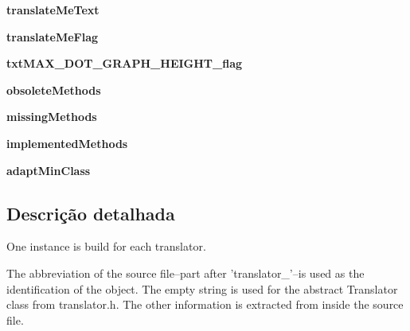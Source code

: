 \begin{DoxyCompactItemize}
\item 
\hypertarget{classtranslator_1_1_transl_a197d2af74d1a50c397381fcace2dabc0}{{\bfseries translate\-Me\-Text}}\label{classtranslator_1_1_transl_a197d2af74d1a50c397381fcace2dabc0}

\item 
\hypertarget{classtranslator_1_1_transl_a46befe7311ca8b2c7f7bd61391a568dc}{{\bfseries translate\-Me\-Flag}}\label{classtranslator_1_1_transl_a46befe7311ca8b2c7f7bd61391a568dc}

\item 
\hypertarget{classtranslator_1_1_transl_a853693f50c963a1af626b44d08f0a10d}{{\bfseries txt\-M\-A\-X\-\_\-\-D\-O\-T\-\_\-\-G\-R\-A\-P\-H\-\_\-\-H\-E\-I\-G\-H\-T\-\_\-flag}}\label{classtranslator_1_1_transl_a853693f50c963a1af626b44d08f0a10d}

\item 
\hypertarget{classtranslator_1_1_transl_aa1faf5cd5cc2cfd7f6fe934f2312a672}{{\bfseries obsolete\-Methods}}\label{classtranslator_1_1_transl_aa1faf5cd5cc2cfd7f6fe934f2312a672}

\item 
\hypertarget{classtranslator_1_1_transl_a0add5de8182f23f3bfb8bb306b853f06}{{\bfseries missing\-Methods}}\label{classtranslator_1_1_transl_a0add5de8182f23f3bfb8bb306b853f06}

\item 
\hypertarget{classtranslator_1_1_transl_a292522c36318f2d93fd93664f3b9ed06}{{\bfseries implemented\-Methods}}\label{classtranslator_1_1_transl_a292522c36318f2d93fd93664f3b9ed06}

\item 
\hypertarget{classtranslator_1_1_transl_ae0c685431d35509f8ac45e2efe5e9ccc}{{\bfseries adapt\-Min\-Class}}\label{classtranslator_1_1_transl_ae0c685431d35509f8ac45e2efe5e9ccc}

\end{DoxyCompactItemize}


\subsection{Descrição detalhada}
\begin{DoxyVerb}One instance is build for each translator.

The abbreviation of the source file--part after 'translator_'--is used as
the identification of the object. The empty string is used for the
abstract Translator class from translator.h. The other information is
extracted from inside the source file.\end{DoxyVerb}
 

